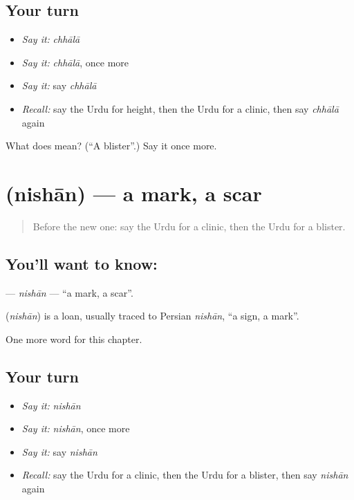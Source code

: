 \subsection*{Your turn}
\begin{itemize}
\raggedright
  \item \emph{Say it:} \emph{chhālā}
  \item \emph{Say it:} \emph{chhālā}, once more
  \item \emph{Say it:} say \emph{chhālā}
  \item \emph{Recall:} say the Urdu for height, then the Urdu for a clinic, then say \emph{chhālā} again
\end{itemize}

\begin{tcolorbox}[breakable,colback=teal!4,colframe=teal!35!black,title={Before you move on}]
What does  mean? (\textquotedblleft{}A blister\textquotedblright{}.) Say it once more.
\end{tcolorbox}
\section[\texorpdfstring{\ur{نشان} (nishān)}{نشان (nishān)}]{ (nishān) — a mark, a scar}

\label{lesson:UR-C244-nishan}



\begin{quote}
Before the new one: say the Urdu for a clinic, then the Urdu for a blister.
\end{quote}

\subsection*{You'll want to know: }
\textbf{} — \emph{nishān} — \textquotedblleft{}a mark, a scar\textquotedblright{}.

\begin{cousinweb}
\textbf{} (\emph{nishān}) is a loan, usually traced to Persian \emph{nishān}, \textquotedblleft{}a sign, a mark\textquotedblright{}.
\end{cousinweb}

\begin{grammarlens}[title={What you've built}]
One more word for this chapter.
\end{grammarlens}

\subsection*{Your turn}
\begin{itemize}
\raggedright
  \item \emph{Say it:} \emph{nishān}
  \item \emph{Say it:} \emph{nishān}, once more
  \item \emph{Say it:} say \emph{nishān}
  \item \emph{Recall:} say the Urdu for a clinic, then the Urdu for a blister, then say \emph{nishān} again
\end{itemize}

